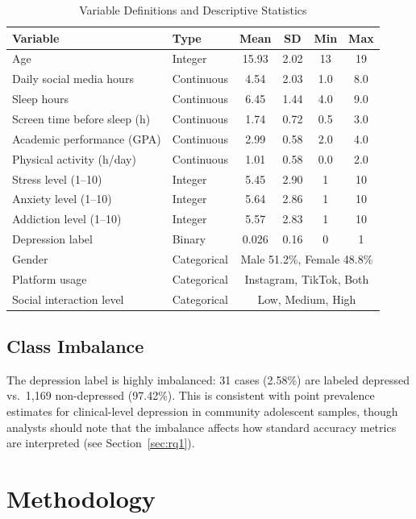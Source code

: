\documentclass[11pt]{article}
\begin{document}
\begin{table}[H]
\centering
\caption{Variable Definitions and Descriptive Statistics}
\label{tab:desc}
\begin{tabular}{llcccc}
\toprule
\textbf{Variable} & \textbf{Type} & \textbf{Mean} & \textbf{SD} & \textbf{Min} & \textbf{Max} \\
\midrule
Age & Integer & 15.93 & 2.02 & 13 & 19 \\
Daily social media hours & Continuous & 4.54 & 2.03 & 1.0 & 8.0 \\
Sleep hours & Continuous & 6.45 & 1.44 & 4.0 & 9.0 \\
Screen time before sleep (h) & Continuous & 1.74 & 0.72 & 0.5 & 3.0 \\
Academic performance (GPA) & Continuous & 2.99 & 0.58 & 2.0 & 4.0 \\
Physical activity (h/day) & Continuous & 1.01 & 0.58 & 0.0 & 2.0 \\
Stress level (1--10) & Integer & 5.45 & 2.90 & 1 & 10 \\
Anxiety level (1--10) & Integer & 5.64 & 2.86 & 1 & 10 \\
Addiction level (1--10) & Integer & 5.57 & 2.83 & 1 & 10 \\
Depression label & Binary & 0.026 & 0.16 & 0 & 1 \\
\midrule
Gender & Categorical & \multicolumn{4}{c}{Male 51.2\%, Female 48.8\%} \\
Platform usage & Categorical & \multicolumn{4}{c}{Instagram, TikTok, Both} \\
Social interaction level & Categorical & \multicolumn{4}{c}{Low, Medium, High} \\
\bottomrule
\end{tabular}
\end{table}

\subsection{Class Imbalance}

The depression label is highly imbalanced: 31 cases (2.58\%) are labeled depressed vs.\
1{,}169 non-depressed (97.42\%).  This is consistent with point prevalence estimates for
clinical-level depression in community adolescent samples, though analysts should note that
the imbalance affects how standard accuracy metrics are interpreted (see
Section~\ref{sec:rq1}).

\section{Methodology}
\label{sec:methods}
\end{document}
